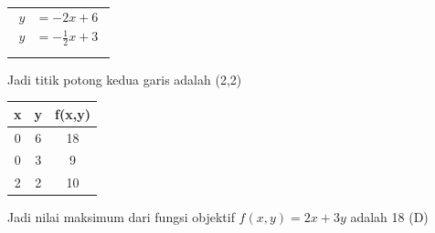 \documentclass{report}
\begin{document}
\begin{enumerate}
\begin{center}
\begin{tabular}{c}
		\parbox{3cm}{
			\begin{align*}
				y&=-2x+6\\
				y&=-\frac{1}{2}x+3\\
			\end{align*}
		} \\
		\hline
		\parbox{3cm}{
			\begin{align*}
				0&=-\frac{5}{2}x+3\\
				-3&=-\frac{3}{2}x\\
				x&=2\\
				y&=-2(2)+6\\
				&=-4+6\\
				&=2
			\end{align*}
		} \\
	\end{tabular}
	\end{center}
Jadi titik potong kedua garis adalah  (2,2)\\
\begin{center}
	\begin{tabular}{|c|c|c|}
		\hline
		x&y&f(x,y)\\
		\hline
		0&6&18\\
		\hline
		0&3&9\\
		\hline
		2&2&10\\
		\hline
	\end{tabular}
\end{center}
Jadi nilai maksimum dari fungsi objektif $f(x,y)=2x+3y$ adalah 18 (D)


\end{enumerate}
\end{document}
